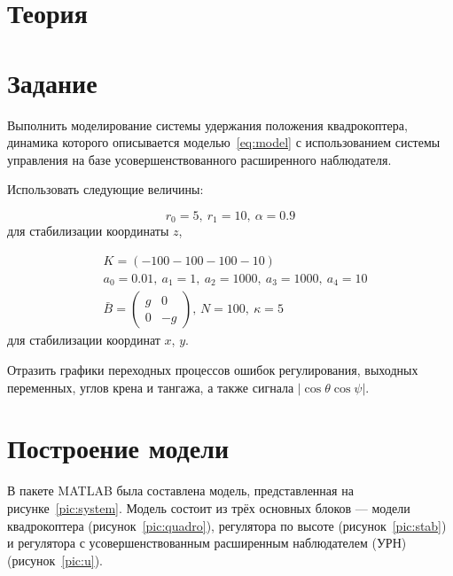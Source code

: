\documentclass[14pt]{extarticle}
\begin{document}
    

    \section*{Теория}

    \section*{Задание}
    Выполнить моделирование системы удержания положения квадрокоптера, динамика которого описывается моделью~\eqref{eq:model}
    с использованием системы управления на базе усовершенствованного расширенного наблюдателя.

    Использовать следующие величины:

    \begin{equation*}
        r_0 = 5,\ r_1 = 10,\ \alpha = 0.9
    \end{equation*}
    для стабилизации координаты $z$,

    \begin{equation*}
        \begin{aligned}
            & K = \left( -100 -100 -100 -10 \right) \\
            & a_0 = 0.01,\ a_1 = 1,\ a_2 = 1000,\ a_3 = 1000,\ a_4 = 10 \\
            & \bar{B} =
            \begin{pmatrix}
                g & 0 \\
                0 & -g
            \end{pmatrix},\,
            N = 100,\ \kappa = 5
        \end{aligned}
    \end{equation*}
    для стабилизации координат $x$, $y$.

    Отразить графики переходных процессов ошибок регулирования, выходных переменных, углов крена и тангажа, а также
    сигнала $\left|\cos{\theta}\cos{\psi}\right|$.

    \section*{Построение модели}
    В пакете MATLAB была составлена модель, представленная на рисунке~\ref{pic:system}. Модель состоит из трёх основных
    блоков --- модели квадрокоптера (рисунок~\ref{pic:quadro}), регулятора по высоте (рисунок~\ref{pic:stab}) и
    регулятора с усовершенствованным расширенным наблюдателем (УРН) (рисунок~\ref{pic:u}).
\end{document}
